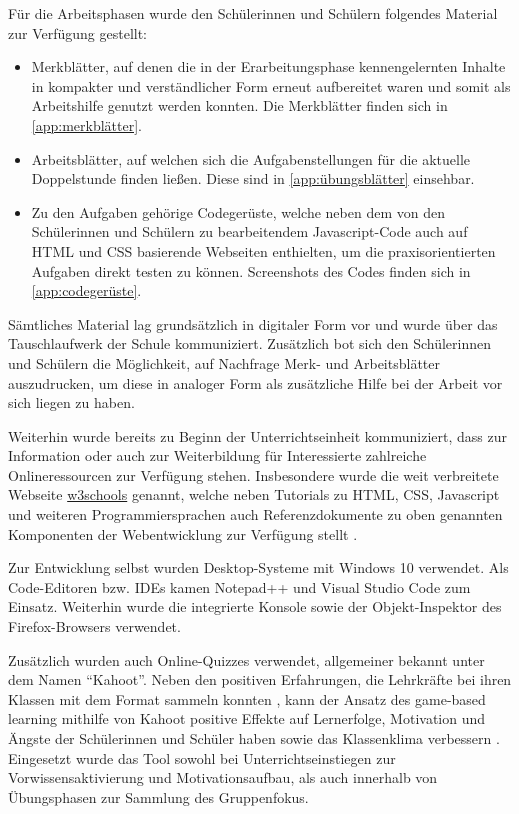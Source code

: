 Für die Arbeitsphasen wurde den Schülerinnen und Schülern folgendes Material zur Verfügung gestellt:
\begin{itemize}
	\item Merkblätter, auf denen die in der Erarbeitungsphase kennengelernten Inhalte in kompakter und verständlicher Form erneut aufbereitet waren und somit als Arbeitshilfe genutzt werden konnten.
	Die Merkblätter finden sich in \autoref{app:merkblätter}.
	\item Arbeitsblätter, auf welchen sich die Aufgabenstellungen für die aktuelle Doppelstunde finden ließen.
	Diese sind in \autoref{app:übungsblätter} einsehbar.
	\item Zu den Aufgaben gehörige Codegerüste, welche neben dem von den Schülerinnen und Schülern zu bearbeitendem Javascript-Code auch auf HTML und CSS basierende Webseiten enthielten, um die praxisorientierten Aufgaben direkt testen zu können.
	Screenshots des Codes finden sich in \autoref{app:codegerüste}.
\end{itemize}
Sämtliches Material lag grundsätzlich in digitaler Form vor und wurde über das Tauschlaufwerk der Schule kommuniziert.
Zusätzlich bot sich den Schülerinnen und Schülern die Möglichkeit, auf Nachfrage Merk- und Arbeitsblätter auszudrucken, um diese in analoger Form als zusätzliche Hilfe bei der Arbeit vor sich liegen zu haben.

Weiterhin wurde bereits zu Beginn der Unterrichtseinheit kommuniziert, dass zur Information oder auch zur Weiterbildung für Interessierte zahlreiche Onlineressourcen zur Verfügung stehen.
Insbesondere wurde die weit verbreitete Webseite \href{https://www.w3schools.com}{w3schools} genannt, welche neben Tutorials zu HTML, CSS, Javascript und weiteren Programmiersprachen auch Referenzdokumente zu oben genannten Komponenten der Webentwicklung zur Verfügung stellt \cite{w3schools}.

Zur Entwicklung selbst wurden Desktop-Systeme mit Windows 10 verwendet.
Als Code-Editoren bzw. IDEs kamen Notepad++ \cite{ho2021notepad++} und Visual Studio Code \cite{microsoft2024vscode} zum Einsatz.
Weiterhin wurde die integrierte Konsole sowie der Objekt-Inspektor des Firefox-Browsers verwendet.

Zusätzlich wurden auch Online-Quizzes verwendet, allgemeiner bekannt unter dem Namen ``Kahoot''.
Neben den positiven Erfahrungen, die Lehrkräfte bei ihren Klassen mit dem Format sammeln konnten \cite{dellos2015kahoot}, kann der Ansatz des game-based learning mithilfe von Kahoot positive Effekte auf Lernerfolge, Motivation und Ängste der Schülerinnen und Schüler haben sowie das Klassenklima verbessern \cite{wang2020kahoot}.
Eingesetzt wurde das Tool sowohl bei Unterrichtseinstiegen zur Vorwissensaktivierung und Motivationsaufbau, als auch innerhalb von Übungsphasen zur Sammlung des Gruppenfokus.